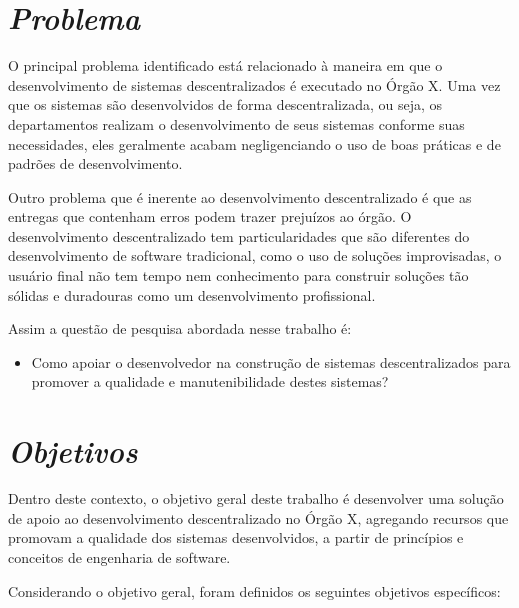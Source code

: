 \section{\textit{Problema}}

O principal problema identificado está relacionado à maneira em que o desenvolvimento de sistemas descentralizados é executado no Órgão X. Uma vez que os sistemas são desenvolvidos de forma descentralizada, ou seja, os departamentos realizam o desenvolvimento de seus sistemas conforme suas necessidades, eles geralmente acabam negligenciando o uso de boas práticas e de padrões de desenvolvimento.

Outro problema que é inerente ao desenvolvimento descentralizado é que as entregas que contenham erros podem trazer prejuízos ao órgão. O desenvolvimento descentralizado tem particularidades que são diferentes do desenvolvimento de software tradicional, como o uso de soluções improvisadas, o usuário final não tem tempo nem conhecimento para construir soluções tão sólidas e duradouras como um desenvolvimento profissional.

Assim a questão de pesquisa abordada nesse trabalho é:
\begin{itemize}
\item Como apoiar o desenvolvedor na construção de sistemas descentralizados para promover a qualidade e manutenibilidade destes sistemas?
\end{itemize}

\section{\textit{Objetivos}}

Dentro deste contexto, o objetivo geral deste trabalho é desenvolver uma solução de apoio ao desenvolvimento descentralizado no Órgão X, agregando recursos que promovam a qualidade dos sistemas desenvolvidos, a partir de princípios e conceitos de engenharia de software.

Considerando o objetivo geral, foram definidos os seguintes objetivos específicos:

